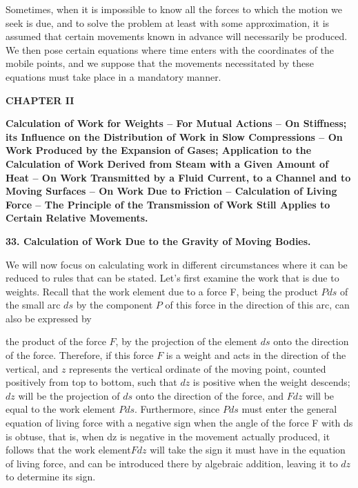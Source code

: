 \documentclass{book}
\begin{document}
Sometimes, when it is impossible to know all the forces to which the motion we seek is due, and to solve the problem at least with some approximation, it is assumed that certain movements known in advance will necessarily be produced. We then pose certain equations where time enters with the coordinates of the mobile points, and we suppose that the movements necessitated by these equations must take place in a mandatory manner.


\newpage
\begin{center}
\huge\bfseries CHAPTER II
\end{center}
\vspace{10mm} %


\textbf{Calculation of Work for Weights – For Mutual Actions – On Stiffness; its Influence on the Distribution of Work in Slow Compressions – On Work Produced by the Expansion of Gases; Application to the Calculation of Work Derived from Steam with a Given Amount of Heat – On Work Transmitted by a Fluid Current, to a Channel and to Moving Surfaces – On Work Due to Friction – Calculation of Living Force – The Principle of the Transmission of Work Still Applies to Certain Relative Movements.}
\vspace{4mm}

\vspace{4mm}
\textbf{33. Calculation of Work Due to the Gravity of Moving Bodies.}
\vspace{4mm} 


We will now focus on calculating work in different circumstances where it can be reduced to rules that can be stated.
Let's first examine the work that is due to weights.
Recall that the work element due to a force F, being the product \(Pds\) of the small arc \(ds\) by the component \(P\) of this force in the direction of this arc, can also be expressed by 

the product of the force \(F\), by the projection of the element \(ds\) onto the direction of the force. Therefore, if this force \(F\) is a weight and acts in the direction of the vertical, and \(z\) represents the vertical ordinate of the moving point, counted positively from top to bottom, such that \(dz\) is positive when the weight descends; \(dz\) will be the projection of \(ds\) onto the direction of the force, and \(Fdz\) will be equal to the work element 
 \(Pds\). Furthermore, since \(Pds\) must enter the general equation of living force with a negative sign when the angle of the force F with ds is obtuse, that is, when dz is negative in the movement actually produced, it follows that the work element\(Fdz\) will take the sign it must have in the equation of living force, and can be introduced there by algebraic addition, leaving it to \(dz\) to determine its sign.
\end{document}
